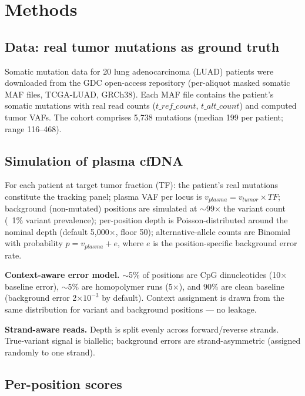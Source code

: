 \documentclass[11pt]{article}
\begin{document}
\section{Methods}
\label{sec:methods}

\subsection{Data: real tumor mutations as ground truth}

Somatic mutation data for 20 lung adenocarcinoma (LUAD) patients were downloaded from the GDC open-access repository (per-aliquot masked somatic MAF files, TCGA-LUAD, GRCh38). Each MAF file contains the patient's somatic mutations with real read counts ($t\_ref\_count$, $t\_alt\_count$) and computed tumor VAFs. The cohort comprises 5,738 mutations (median 199 per patient; range 116--468).

\subsection{Simulation of plasma cfDNA}

For each patient at target tumor fraction (TF): the patient's real mutations constitute the tracking panel; plasma VAF per locus is $v_{plasma} = v_{tumor} \times TF$; background (non-mutated) positions are simulated at $\sim$99$\times$ the variant count (~1\% variant prevalence); per-position depth is Poisson-distributed around the nominal depth (default 5,000$\times$, floor 50); alternative-allele counts are Binomial with probability $p = v_{plasma} + e$, where $e$ is the position-specific background error rate.

\textbf{Context-aware error model.} $\sim$5\% of positions are CpG dinucleotides (10$\times$ baseline error), $\sim$5\% are homopolymer runs (5$\times$), and 90\% are clean baseline (background error 2$\times10^{-3}$ by default). Context assignment is drawn from the same distribution for variant and background positions --- no leakage.

\textbf{Strand-aware reads.} Depth is split evenly across forward/reverse strands. True-variant signal is biallelic; background errors are strand-asymmetric (assigned randomly to one strand).

\subsection{Per-position scores}
\end{document}
